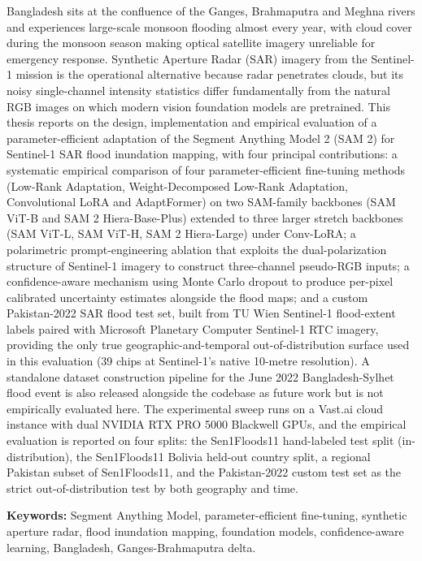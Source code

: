 \documentclass[11pt,a4paper,oneside]{report}
\begin{document}
Bangladesh sits at the confluence of the Ganges, Brahmaputra and Meghna rivers and experiences large-scale monsoon flooding almost every year, with cloud cover during the monsoon season making optical satellite imagery unreliable for emergency response. Synthetic Aperture Radar (SAR) imagery from the Sentinel-1 mission is the operational alternative because radar penetrates clouds, but its noisy single-channel intensity statistics differ fundamentally from the natural RGB images on which modern vision foundation models are pretrained. This thesis reports on the design, implementation and empirical evaluation of a parameter-efficient adaptation of the Segment Anything Model 2 (SAM 2) for Sentinel-1 SAR flood inundation mapping, with four principal contributions: a systematic empirical comparison of four parameter-efficient fine-tuning methods (Low-Rank Adaptation, Weight-Decomposed Low-Rank Adaptation, Convolutional LoRA and AdaptFormer) on two SAM-family backbones (SAM ViT-B and SAM 2 Hiera-Base-Plus) extended to three larger stretch backbones (SAM ViT-L, SAM ViT-H, SAM 2 Hiera-Large) under Conv-LoRA; a polarimetric prompt-engineering ablation that exploits the dual-polarization structure of Sentinel-1 imagery to construct three-channel pseudo-RGB inputs; a confidence-aware mechanism using Monte Carlo dropout to produce per-pixel calibrated uncertainty estimates alongside the flood maps; and a custom Pakistan-2022 SAR flood test set, built from TU Wien Sentinel-1 flood-extent labels paired with Microsoft Planetary Computer Sentinel-1 RTC imagery, providing the only true geographic-and-temporal out-of-distribution surface used in this evaluation (39 chips at Sentinel-1's native 10-metre resolution). A standalone dataset construction pipeline for the June 2022 Bangladesh-Sylhet flood event is also released alongside the codebase as future work but is not empirically evaluated here. The experimental sweep runs on a Vast.ai cloud instance with dual NVIDIA RTX PRO 5000 Blackwell GPUs, and the empirical evaluation is reported on four splits: the Sen1Floods11 hand-labeled test split (in-distribution), the Sen1Floods11 Bolivia held-out country split, a regional Pakistan subset of Sen1Floods11, and the Pakistan-2022 custom test set as the strict out-of-distribution test by both geography and time.

\vspace{1em}
\noindent\textbf{Keywords:} Segment Anything Model, parameter-efficient fine-tuning, synthetic aperture radar, flood inundation mapping, foundation models, confidence-aware learning, Bangladesh, Ganges-Brahmaputra delta.
\end{document}
